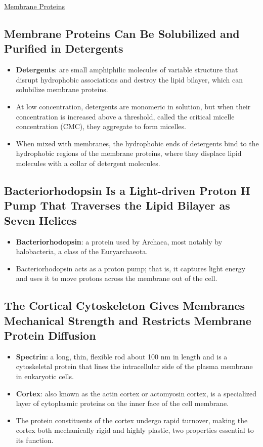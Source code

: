 \documentclass[12pt,letterpaper]{article}
\begin{document}
\begin{secbox}{\hyperlink{10}{Membrane Proteins}}
{    \hypertarget{10.12}{\subsection*{Membrane Proteins Can Be Solubilized and Purified in Detergents}}
    \begin{itemize}
        \item \textbf{Detergents}: are small amphiphilic molecules of variable structure that disrupt hydrophobic associations and destroy the lipid bilayer, which can solubilize membrane proteins.
        \item At low concentration, detergents are monomeric in solution, but when their concentration is increased above a threshold, called the critical micelle concentration (CMC), they aggregate to form micelles.
        \item When mixed with membranes, the hydrophobic ends of detergents bind to the hydrophobic regions of the membrane proteins, where they displace lipid molecules with a collar of detergent molecules.
    \end{itemize}

    \hypertarget{10.13}{\subsection*{Bacteriorhodopsin Is a Light-driven Proton H\bfg{^+} Pump That Traverses the Lipid Bilayer as Seven \bfg{\alpha} Helices}}
    \begin{itemize}
        \item \textbf{Bacteriorhodopsin}: a protein used by Archaea, most notably by halobacteria, a class of the Euryarchaeota.
        \item Bacteriorhodopsin acts as a proton pump; that is, it captures light energy and uses it to move protons across the membrane out of the cell.
    \end{itemize}

    \hypertarget{10.14}{\subsection*{The Cortical Cytoskeleton Gives Membranes Mechanical Strength and Restricts Membrane Protein Diffusion}}
    \begin{itemize}
        \item \textbf{Spectrin}: a long, thin, flexible rod about 100 nm in length and is a cytoskeletal protein that lines the intracellular side of the plasma membrane in eukaryotic cells.  
        \item \textbf{Cortex}: also known as the actin cortex or actomyosin cortex, is a specialized layer of cytoplasmic proteins on the inner face of the cell membrane.
        \item The protein constituents of the cortex undergo rapid turnover, making the cortex both mechanically rigid and highly plastic, two properties essential to its function.
    \end{itemize}

}
\end{secbox}
\end{document}
